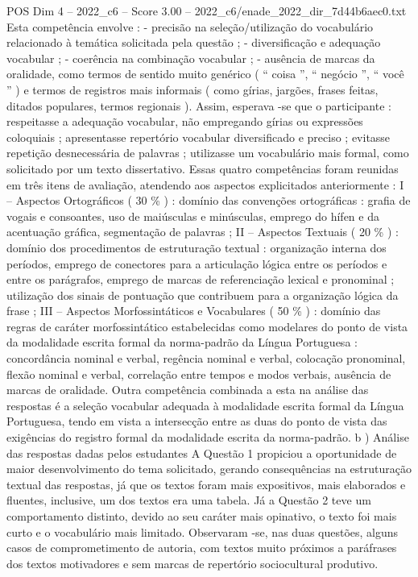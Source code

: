 \begin{textsample}{POS Dim 4 – 2022\_c6 – Score 3.00 – 2022\_c6/enade\_2022\_dir\_7d44b6aec0.txt}
Esta competência envolve : - precisão na seleção/utilização do vocabulário relacionado à temática solicitada pela questão ; - diversificação e adequação vocabular ; - coerência na combinação vocabular ; - ausência de marcas da oralidade, como termos de sentido muito genérico ( “ coisa ”, “ negócio ”, “ você ” ) e termos de registros mais informais ( como gírias, jargões, frases feitas, ditados populares, termos regionais ).
Assim, esperava -se que o participante : respeitasse a adequação vocabular, não empregando gírias ou expressões coloquiais ; apresentasse repertório vocabular diversificado e preciso ; evitasse repetição desnecessária de palavras ; utilizasse um vocabulário mais formal, como solicitado por um texto dissertativo.
Essas quatro competências foram reunidas em três itens de avaliação, atendendo aos aspectos explicitados anteriormente : I – Aspectos Ortográficos ( 30 \% ) : domínio das convenções ortográficas : grafia de vogais e consoantes, uso de maiúsculas e minúsculas, emprego do hífen e da acentuação gráfica, segmentação de palavras ; II – Aspectos Textuais ( 20 \% ) : domínio dos procedimentos de estruturação textual : organização interna dos períodos, emprego de conectores para a articulação lógica entre os períodos e entre os parágrafos, emprego de marcas de referenciação lexical e pronominal ; utilização dos sinais de pontuação que contribuem para a organização lógica da frase ; III – Aspectos Morfossintáticos e Vocabulares ( 50 \% ) : domínio das regras de caráter morfossintático estabelecidas como modelares do ponto de vista da modalidade escrita formal da norma-padrão da Língua Portuguesa : concordância nominal e verbal, regência nominal e verbal, colocação pronominal, flexão nominal e verbal, correlação entre tempos e modos verbais, ausência de marcas de oralidade.
Outra competência combinada a esta na análise das respostas é a seleção vocabular adequada à modalidade escrita formal da Língua Portuguesa, tendo em vista a intersecção entre as duas do ponto de vista das exigências do registro formal da modalidade escrita da norma-padrão. b ) Análise das respostas dadas pelos estudantes A Questão 1 propiciou a oportunidade de maior desenvolvimento do tema solicitado, gerando consequências na estruturação textual das respostas, já que os textos foram mais expositivos, mais elaborados e fluentes, inclusive, um dos textos era uma tabela.
Já a Questão 2 teve um comportamento distinto, devido ao seu caráter mais opinativo, o texto foi mais curto e o vocabulário mais limitado.
Observaram -se, nas duas questões, alguns casos de comprometimento de autoria, com textos muito próximos a paráfrases dos textos motivadores e sem marcas de repertório sociocultural produtivo.

\end{textsample}
